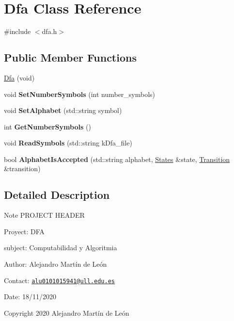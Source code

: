\hypertarget{classDfa}{}\section{Dfa Class Reference}
\label{classDfa}


{\ttfamily \#include $<$dfa.\+h$>$}

\subsection*{Public Member Functions}
\begin{DoxyCompactItemize}
\item 
\hyperlink{classDfa_a89c2bffef86525363c275b3fe60fc57f}{Dfa} (void)
\item 
\mbox{\label{classDfa_ac022a12536c2a855066fdfd85fba5ed9}} 
void {\bfseries Set\+Number\+Symbols} (int number\+\_\+symbols)
\item 
\mbox{\label{classDfa_a094525697d759c4b5b36bf562d920916}} 
void {\bfseries Set\+Alphabet} (std\+::string symbol)
\item 
\mbox{\label{classDfa_a21239eac92e02d748bdc5cee0c52b831}} 
int {\bfseries Get\+Number\+Symbols} ()
\item 
\mbox{\label{classDfa_ac596e302028cb885e1a8eae2f1f60e69}} 
void {\bfseries Read\+Symbols} (std\+::string k\+Dfa\+\_\+file)
\item 
\mbox{\label{classDfa_a0de3553aca8cf0329bf12a7b1acaa291}} 
bool {\bfseries Alphabet\+Is\+Accepted} (std\+::string alphabet, \hyperlink{classStates}{States} \&state, \hyperlink{classTransition}{Transition} \&transition)
\end{DoxyCompactItemize}


\subsection{Detailed Description}
\begin{DoxyNote}{Note}
P\+R\+O\+J\+E\+CT H\+E\+A\+D\+ER 

Proyect\+: D\+FA 

subject\+: Computabilidad y Algoritmia 

Author\+: Alejandro Martín de León 

Contact\+: \href{mailto:alu0101015941@ull.edu.es}{\tt alu0101015941@ull.\+edu.\+es} 

Date\+: 18/11/2020 

Copyright 2020 Alejandro Martín de León 
\end{DoxyNote}


